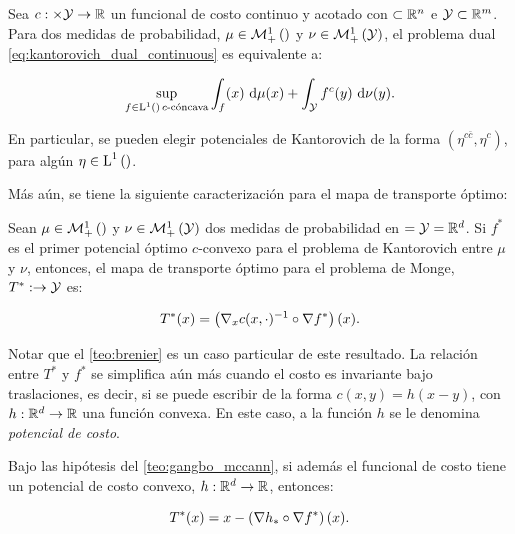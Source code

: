 \begin{teo}
	\label{teo:dual_c_transform}
	Sea $c:\times\mathcal{Y}\to\mathbb{R}$ un funcional de costo continuo y acotado con $\subset\mathbb{R}^n$ e $\mathcal{Y}\subset\mathbb{R}^m$. Para dos medidas de probabilidad, $\mu\in\mathcal{M}_+^1\left(\right)$ y $\nu\in\mathcal{M}_+^1\left(\mathcal{Y}\right)$, el problema dual \eqref{eq:kantorovich_dual_continuous} es equivalente a:

	\begin{equation*}
		\sup_{f\in \operatorname{L}^{1}\left(\right)\, c\text{-cóncava}} \int_ f(x) \,\operatorname{d}\!\mu(x) + \int_{\mathcal{Y}} f^c(y) \,\operatorname{d}\!\nu(y).
	\end{equation*}

	En particular, se pueden elegir potenciales de Kantorovich de la forma $(\eta^{c \bar c},\eta^c)$, para algún $\eta\in\operatorname{L}^{1}\left(\right)$.
\end{teo}

Más aún, se tiene la siguiente caracterización para el mapa de transporte óptimo:

\begin{teo}
	\label{teo:gangbo_mccann}
	Sean $\mu\in\mathcal{M}_+^1\left(\right)$ y $\nu\in\mathcal{M}_+^1\left(\mathcal{Y}\right)$ dos medidas de probabilidad en $=\mathcal{Y}=\mathbb{R}^d$. Si $f^*$ es el primer potencial óptimo $c$-convexo para el problema de Kantorovich entre $\mu$ y $\nu$, entonces, el mapa de transporte óptimo para el problema de Monge, $T^*:\to\mathcal{Y}$ es:

	\begin{equation*}
		T^*(x) = \left(\nabla_x c(x,\cdot)^{-1}\circ \nabla f^*\right)(x).
	\end{equation*}
\end{teo}

Notar que el \autoref{teo:brenier} es un caso particular de este resultado. La relación entre $T^*$ y $f^*$ se simplifica aún más cuando el costo es invariante bajo traslaciones, es decir, si se puede escribir de la forma $c(x,y)=h(x-y)$, con $h:\mathbb{R}^d\to\mathbb{R}$ una función convexa. En este caso, a la función $h$ se le denomina \textit{potencial de costo}.

\begin{cor}
	Bajo las hipótesis del \autoref{teo:gangbo_mccann}, si además el funcional de costo tiene un potencial de costo convexo, $h:\mathbb{R}^d\to\mathbb{R}$, entonces:

	\begin{equation*}
		T^*(x) = x - \left(\nabla h_* \circ \nabla f^*\right)(x).
	\end{equation*}
\end{cor}

